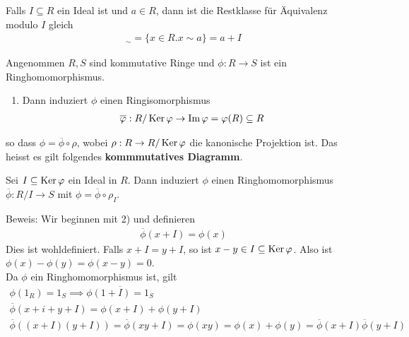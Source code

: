Falls $I \subseteq R$ ein Ideal ist und $a \in R$, dann ist die Restklasse für Äquivalenz modulo $I$ gleich
\begin{align*}
	[a]_{\sim} = \{x \in R. x \sim a\} = a + I
\end{align*}



\begin{nsatz}
	Angenommen $R,S$ sind kommutative Ringe und $\phi: R \to S$ ist ein Ringhomomorphismus.
	\begin{enumerate}
	\item Dann induziert $\phi$ einen Ringisomorphismus
		\begin{align*}
			\overline{\varphi}: R/\operatorname{Ker} \varphi \to \operatorname{Im} \varphi = \varphi(R) \subseteq R
		\end{align*}
	\end{enumerate}
	so dass $\phi = \overline{\phi} \circ \rho$, wobei $\rho: R \to R/ \operatorname{Ker} \varphi$ die kanonische Projektion ist. Das heisst es gilt folgendes \textbf{kommmutatives Diagramm}.

\item Sei $I \subseteq \operatorname{Ker} \varphi$ ein Ideal in $R$. Dann induziert $\phi$ einen Ringhomomorphismus $\overline{\phi}: R/I \to S$ mit $\phi = \overline{\phi} \circ \rho_I$. 
\end{nsatz}

Beweis: Wir beginnen mit 2) und definieren
\begin{align*}
	\overline{\phi}(x + I) = \phi(x)
\end{align*}
Dies ist wohldefiniert. Falls $x + I = y + I$, so ist $x-y \in I \subseteq \operatorname{Ker} \varphi$. Also ist $\phi(x) - \phi(y) = \phi(x-y) = 0$.\\

Da $\phi$ ein Ringhomomorphismus ist, gilt 
\begin{align*}
	\phi(1_R) = 1_S \implies \overline{\phi(1 + I) = 1_S}\\
\overline{\phi}(x + i + y + I) = \phi(x + I) + \phi(y + I)\\
\overline{\phi}((x + I)(y + I)) = \overline{\phi}(xy + I) = \phi(xy) = \phi(x) + \phi(y) = \overline{\phi}(x + I) \overline{\phi}(y + I)
\end{align*}

